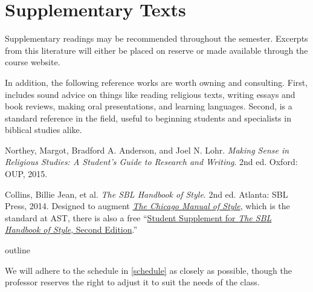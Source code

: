 \documentclass[titlepage]{article}
\begin{document}
\section{Supplementary Texts}
\label{supplementary}

Supplementary readings may be recommended throughout the semester.
Excerpts from this literature will either be placed on reserve or made
available through the course website.

In addition, the following reference works are worth owning and
consulting. First, \cite{rlgs} includes sound advice on things like
reading religious texts, writing essays and book reviews, making oral
presentations, and learning languages. Second, \cite{sbl2} is a standard
reference in the field, useful to beginning students and specialists in
biblical studies alike.

\begingroup
\renewcommand{\section}[2]{}%
\begin{thebibliography}{9}%

	 Northey, Margot, Bradford A. Anderson, and Joel N. Lohr.
	\emph{Making Sense in Religious Studies: A Student's Guide to Research and Writing}. 2nd ed.
	Oxford: OUP, 2015. %

	 Collins, Billie Jean, et al.
	\emph{The SBL Handbook of Style}. 2nd ed.
	Atlanta: SBL Press, 2014. %
	Designed to augment \href{http://www.chicagomanualofstyle.org/home.html}{\emph{The Chicago Manual of Style}},
	which is the standard at AST, there is also a free
	“\href{https://www.sbl-site.org/assets/pdfs/pubs/SBLHSsupp2015-02.pdf}{Student Supplement for \emph{The SBL Handbook of Style}, Second Edition}.”

\end{thebibliography}
\endgroup

\section{Course Outline}
\label{outline}

\newcommand\bsc[1]{\cite[#1]{childs}}
\newcommand\bds[1]{\cite[#1]{sommer}}
\newcommand\gvr[1]{\cite[#1]{vonrad}}
\newcommand\nys[1]{\cite[#1]{nyssa}}

We will adhere to the schedule in \autoref{schedule} as closely as
possible, though the professor reserves the right to adjust it to suit
the needs of the class.
\end{document}
